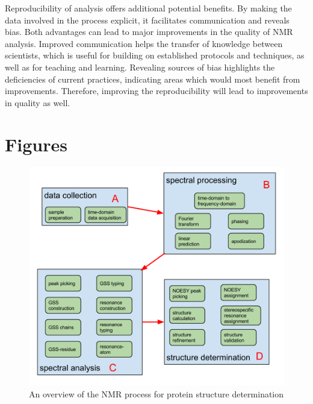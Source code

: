 Reproducibility of analysis offers additional potential benefits.  By making
the data involved in the process explicit, it facilitates communication and
reveals bias.  Both advantages can lead to major improvements in the quality
of NMR analysis.  Improved communication helps the transfer of knowledge
between scientists, which is useful for building on established protocols
and techniques, as well as for teaching and learning.  Revealing sources of
bias highlights the deficiencies of current practices, indicating areas 
which would most benefit from improvements.  Therefore, improving the 
reproducibility will lead to improvements in quality as well.


\clearpage
\section{Figures}

\begin{figure}[h]
  \includegraphics[scale=0.42]{figures/nmr_overview}
  \caption{An overview of the NMR process for protein structure determination}
  \label{nmr_overview}
\end{figure}


